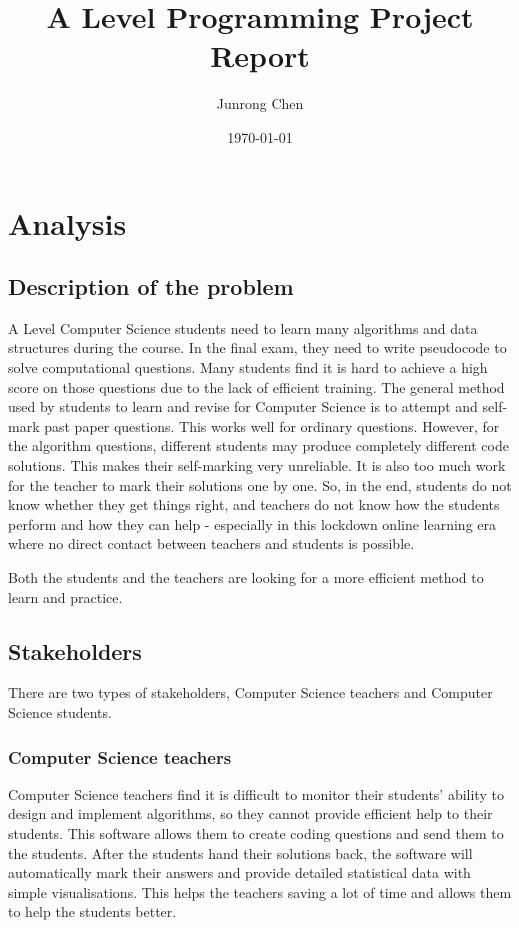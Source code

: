\documentclass{report}
\title{A Level Programming Project Report}
\author{Junrong Chen}
\date{\today}
\begin{document}
\maketitle
\tableofcontents
\clearpage
\chapter{Analysis}

\section{Description of the problem}

A Level Computer Science students need to learn many algorithms and data structures during the course. In the final exam, they need to write pseudocode to solve computational questions. Many students find it is hard to achieve a high score on those questions due to the lack of efficient training. The general method used by students to learn and revise for Computer Science is to attempt and self-mark past paper questions. This works well for ordinary questions. However, for the algorithm questions, different students may produce completely different code solutions. This makes their self-marking very unreliable. It is also too much work for the teacher to mark their solutions one by one. So, in the end, students do not know whether they get things right, and teachers do not know how the students perform and how they can help - especially in this lockdown online learning era where no direct contact between teachers and students is possible.

Both the students and the teachers are looking for a more efficient method to learn and practice.

\section{Stakeholders}

There are two types of stakeholders, Computer Science teachers and Computer Science students.

\subsection{Computer Science teachers}

Computer Science teachers find it is difficult to monitor their students' ability to design and implement algorithms, so they cannot provide efficient help to their students. This software allows them to create coding questions and send them to the students. After the students hand their solutions back, the software will automatically mark their answers and provide detailed statistical data with simple visualisations. This helps the teachers saving a lot of time and allows them to help the students better.
\end{document}
